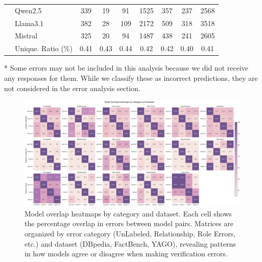 \begin{table}[ht!]
{\begin{threeparttable}
\begin{tabular}{llcccccc||c}
                                        & Qwen2.5                            & 339      & 19    & 91  & 1525    & 357   & 237   & 2568 \\
                                        & Llama3.1                           & 382      & 28    & 109 & 2172    & 509   & 318   & 3518 \\
                                        & Mistral                            & 325      & 20    & 94  & 1487    & 438   & 241   & 2605 \\ \cline{2-9}
                                        & Unique. Ratio (\%)                 & 0.41     & 0.43  & 0.44 & 0.42   & 0.42  & 0.40  & 0.41 \\
            \bottomrule
        \end{tabular}
    \begin{tablenotes}
         \item[*] Some errors may not be included in this analysis because we did not receive any responses for them. While we classify these as incorrect predictions, they are not considered in the error analysis section.
    \end{tablenotes}
    \end{threeparttable}}
    \label{tab:error_results-full-wo-category-all-datasets}
\end{table}

\begin{figure}[ht!]
    \centering
    \begin{minipage}[b]{\textwidth}
        \centering
        \includegraphics[width=\textwidth]{res/overlap_heatmaps_by_dataset}
    \end{minipage}
    \caption{Model overlap heatmaps by category and dataset. Each cell shows the percentage overlap in errors between model pairs. Matrices are organized by error category (UnLabeled, Relationship, Role Errors, etc.) and dataset (DBpedia, FactBench, YAGO), revealing patterns in how models agree or disagree when making verification errors.}
    \label{fig:overlap_heatmaps_by_dataset}
\end{figure}

